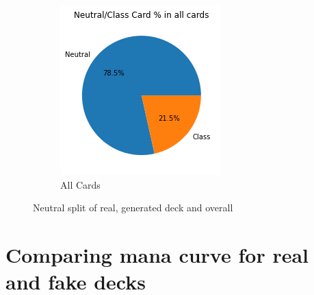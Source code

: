 \documentclass{report} %
\begin{document}
\begin{figure}[H]
\begin{subfigure}{.3\textwidth}
  \centering
  \includegraphics[width=.75\linewidth]{TestImages/NeutralSplitAllCards}
  \caption{All Cards}
\end{subfigure}
\caption{Neutral split of real, generated deck and overall}
\end{figure}
\section{Comparing mana curve for real and fake decks}
\end{document}
